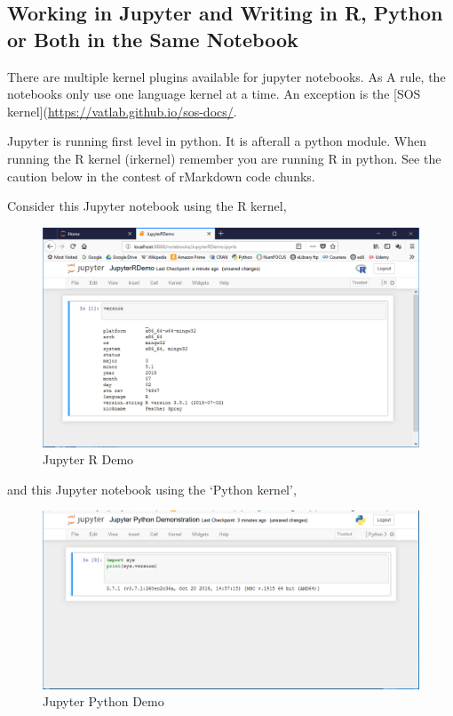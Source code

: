 \documentclass[]{book}
\theoremstyle{definition}
\theoremstyle{definition}
\theoremstyle{definition}
\theoremstyle{remark}
\begin{document}
\subsection{Working in Jupyter and Writing in R, Python or Both in the
Same
Notebook}\label{working-in-jupyter-and-writing-in-r-python-or-both-in-the-same-notebook}

There are multiple kernel plugins available for jupyter notebooks. As A
rule, the notebooks only use one language kernel at a time. An exception
is the {[}SOS kernel{]}(\url{https://vatlab.github.io/sos-docs/}.

Jupyter is running first level in python. It is afterall a python
module. When running the R kernel (irkernel) remember
you are running R in python. See the caution below in the contest of
rMarkdown code chunks.

Consider this Jupyter notebook using the R kernel,

\begin{figure}
\centering
\includegraphics{images/JupyterRSession.png}
\caption{Jupyter R Demo}
\end{figure}

and this Jupyter notebook using the `Python kernel',

\begin{figure}
\centering
\includegraphics{images/JupyterPythonSession.png}
\caption{Jupyter Python Demo}
\end{figure}
\end{document}
